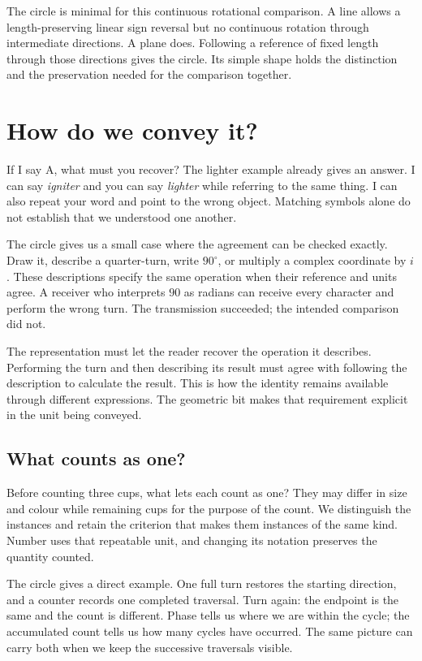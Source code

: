\documentclass[11pt,a4paper]{article}
\theoremstyle{definition}
\begin{document}
The circle is minimal for this continuous rotational comparison.
A line allows a length-preserving linear sign reversal but no
continuous rotation through intermediate directions. A plane does.
Following a reference of fixed length through those directions
gives the circle. Its simple shape holds the distinction and the
preservation needed for the comparison together.

\section{How do we convey it?}
\label{sec:v1-meaning}

If I say A, what must you recover? The lighter example already gives
an answer. I can say \emph{igniter} and you can say \emph{lighter}
while referring to the same thing. I can also repeat your word and
point to the wrong object. Matching symbols alone do not establish
that we understood one another.

The circle gives us a small case where the agreement can be checked
exactly. Draw it, describe a quarter-turn, write $90^\circ$, or
multiply a complex coordinate by $i$. These descriptions specify
the same operation when their reference and units agree. A receiver
who interprets $90$ as radians can receive every character and
perform the wrong turn. The transmission succeeded; the intended
comparison did not.

The representation must let the reader recover the operation it
describes. Performing the turn and then describing its result must
agree with following the description to calculate the result.
This is how the identity remains available through different
expressions. The geometric bit makes that requirement explicit
in the unit being conveyed.

\subsection{What counts as one?}

Before counting three cups, what lets each count as one? They may
differ in size and colour while remaining cups for the purpose of
the count. We distinguish the instances and retain the criterion
that makes them instances of the same kind. Number uses that
repeatable unit, and changing its notation preserves the quantity
counted.

The circle gives a direct example. One full turn restores the
starting direction, and a counter records one completed traversal.
Turn again: the endpoint is the same and the count is different.
Phase tells us where we are within the cycle; the accumulated count
tells us how many cycles have occurred. The same picture can carry
both when we keep the successive traversals visible.
\end{document}
